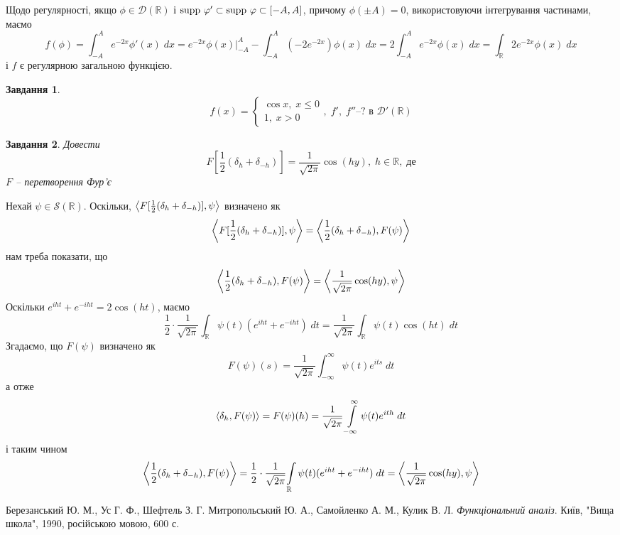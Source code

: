 \documentclass[10pt]{article}
\newtheorem{prob}{Завдання}
\newcommand{\dt}{\;dt}
\newcommand{\dx}{\;dx}
\begin{document}
Щодо регулярності, якщо $\phi\in\mathcal{D}(\mathbb{R})$ і $\mbox{supp }\varphi'\subset\mbox{supp }\varphi\subset[-A,A]$, причому $\phi(\pm A)=0$, використовуючи
інтегрування частинами, маємо
\[f(\phi)=\int_{-A}^Ae^{-2x}\phi'(x)\dx=e^{-2x}\phi(x)\bigg|_{-A}^A-\int_{-A}^A(-2e^{-2x})\phi(x)\dx=2\int_{-A}^Ae^{-2x}\phi(x)\dx=
\int_\mathbb{R}2e^{-2x}\phi(x)\dx\]
і $f$ є регулярною загальною функцією.
\begin{prob}
	\[f(x)=\left\{\begin{array}{ll}\cos x,\;x\leq0\\1,\;x>0\end{array}\right.,\;\mbox{$f',\;f''$--?{ в }$\mathcal{D}'(\mathbb{R})$}\]
\end{prob}
\begin{prob}
	Довести
	\[F[\frac{1}{2}(\delta_h+\delta_{-h})]=\frac{1}{\sqrt{2\pi}}\cos(hy),\;h\in\mathbb{R},\;\mbox{де}\]
	$F$ -- перетворення Фур’є
\end{prob}
Нехай $\psi\in\mathcal{S}(\mathbb{R})$. Оскільки, $\left<F[\frac{1}{2}(\delta_h+\delta_{-h})],\psi\right>$ визначено як
\[\left<F[\frac{1}{2}(\delta_h+\delta_{-h})],\psi\right>=\left<\frac{1}{2}(\delta_h+\delta_{-h}),F(\psi)\right>\]
нам треба показати, що
\[\left<\frac{1}{2}(\delta_h+\delta_{-h}),F(\psi)\right>=\left<\frac{1}{\sqrt{2\pi}}\cos(hy),\psi\right>\]
Оскільки $e^{iht}+e^{-iht}=2\cos(ht)$, маємо
\[\frac{1}{2}\cdot\frac{1}{\sqrt{2\pi}}{\int_{\mathbb{R}}\psi(t)(e^{iht}+e^{-iht})\dt}=\frac{1}{\sqrt{2\pi}}\int_{\mathbb{R}}\psi(t)
\cos(ht)\dt\]
Згадаємо, що $F(\psi)$ визначено як
\[F(\psi)(s)=\frac{1}{\sqrt{2\pi}}\int_{-\infty}^\infty \psi(t)e^{its}\dt\]
а отже
\[\myabra{\delta_h,F(\psi)}=F(\psi)(h)=\frac{1}{\sqrt{2\pi}}\int_{-\infty}^\infty \psi(t)e^{ith}\dt\]
і таким чином
\[\myabra{\frac{1}{2}(\delta_h+\delta_{-h}),F(\psi)}=\frac{1}{2}\cdot\frac{1}{\sqrt{2\pi}}{\int_{\mathbb{R}}\psi(t)(e^{iht}+e^{-iht})\dt
}=
\myabra{\frac{1}{\sqrt{2\pi}}\cos(hy),\psi}\]
\begin{thebibliography}{9}
Березанський Ю. М., Ус Г. Ф., Шефтель З. Г.
Митропольський Ю. А., Самойленко А. М., Кулик В. Л.
\emph{Функціональний аналіз}.
Київ, "Вища школа"{}, 1990, російською мовою, 600 с.
\end{thebibliography}
\end{document}

